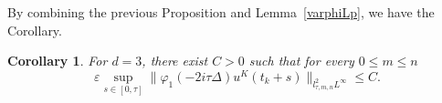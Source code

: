 \documentclass[10pt,a4paper]{article}
\newtheorem{corollary}[theorem]{Corollary}
\newtheorem{remark}[theorem]{Remark}
\begin{document}
  By combining the previous Proposition and Lemma~\ref{varphiLp}, we have the
  Corollary.
  \begin{corollary}\label{phiuKL2Linftyd3}
    For \(d=3\), there exist \(C>0\) such that for every \(0\leq m\leq n\)
    \[ \varepsilon \sup_{s\in[0,\tau]} \|\varphi_1(-2i\tau\Delta)u^K(t_k+s)\|_{l^2_{\tau,m,n}L^\infty} 
    \leq C. \]
  \end{corollary}
  

\end{document}
